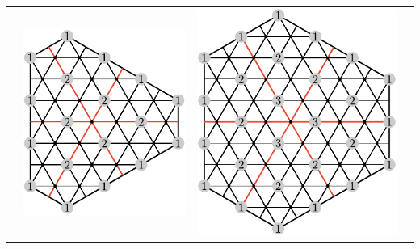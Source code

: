 \documentclass[11pt,oneside]{article}
\begin{document}
\begin{center}
\begin{tabular}{ c c c c }
& \includegraphics[scale=0.6]{images/sl3_weights_31.pdf}
& \includegraphics[scale=0.6]{images/sl3_weights_32.pdf}

\end{tabular}
\end{center}
\end{document}
